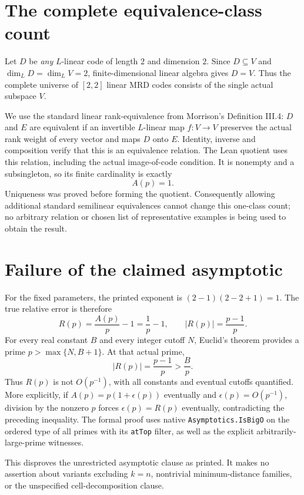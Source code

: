 \documentclass[10pt,a4paper]{article}
\begin{document}
\section*{The complete equivalence-class count}
Let $D$ be \emph{any} $L$-linear code of length $2$ and dimension $2$.
Since $D\subseteq V$ and $\dim_L D=\dim_L V=2$, finite-dimensional linear
algebra gives $D=V$. Thus the complete universe of $[2,2]$ linear MRD
codes consists of the single actual subspace $V$.

We use the standard linear rank-equivalence from Morrison's
Definition III.4: $D$ and $E$ are equivalent if an invertible $L$-linear
map $f:V\to V$ preserves the actual rank weight of every vector and
maps $D$ onto $E$. Identity, inverse and composition verify that this is
an equivalence relation. The Lean quotient uses this relation, including
the actual image-of-code condition. It is nonempty and a subsingleton,
so its finite cardinality is exactly
\[
  A(p)=1.
\]
Uniqueness was proved before forming the quotient. Consequently allowing
additional standard semilinear equivalences cannot change this one-class
count; no arbitrary relation or chosen list of representative examples is
being used to obtain the result.

\section*{Failure of the claimed asymptotic}
For the fixed parameters, the printed exponent is
$(2-1)(2-2+1)=1$. The true relative error is therefore
\[
 R(p)=\frac{A(p)}p-1=\frac1p-1,
 \qquad |R(p)|=\frac{p-1}p.
\]
For every real constant $B$ and every integer cutoff $N$, Euclid's theorem
provides a prime $p>\max\{N,B+1\}$. At that actual prime,
\[
  |R(p)|=\frac{p-1}p>\frac Bp.
\]
Thus $R(p)$ is not $O(p^{-1})$, with all constants and eventual cutoffs
quantified. More explicitly, if $A(p)=p(1+\epsilon(p))$ eventually and
$\epsilon(p)=O(p^{-1})$, division by the nonzero $p$ forces
$\epsilon(p)=R(p)$ eventually, contradicting the preceding inequality.
The formal proof uses native \texttt{Asymptotics.IsBigO} on the ordered
type of all primes with its \texttt{atTop} filter, as well as the explicit
arbitrarily-large-prime witnesses.

This disproves the unrestricted asymptotic clause as printed. It makes
no assertion about variants excluding $k=n$, nontrivial minimum-distance
families, or the unspecified cell-decomposition clause.
\end{document}
